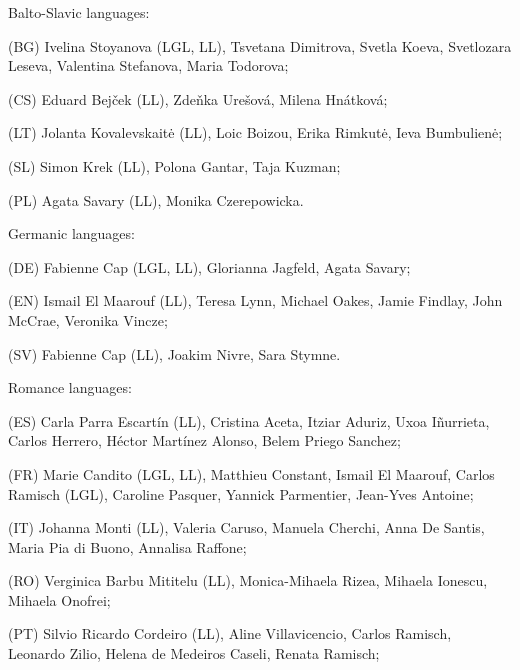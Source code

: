 \documentclass[output=paper,
modfonts,
]{langscibook}
\begin{document}
\noindent Balto-Slavic languages:
 \begin{sitem}
 \item (BG) Ivelina Stoyanova (LGL, LL), Tsvetana Dimitrova, Svetla Koeva, Svetlozara Leseva, Valentina Stefanova, Maria Todorova;
 \item (CS) Eduard Bejček (LL), Zdeňka Urešová, Milena Hnátková;
 \item (LT) Jolanta Kovalevskait\.e (LL), Loic Boizou, Erika Rimkut\.e, Ieva Bumbulien\.e;
 \item (SL) Simon Krek (LL), Polona Gantar, Taja Kuzman;
 \item (PL) Agata Savary (LL), Monika Czerepowicka.
 \end{sitem} 

\noindent Germanic languages:
 \begin{sitem}
 \item (DE) Fabienne Cap (LGL, LL), Glorianna Jagfeld, Agata Savary;
 \item (EN) Ismail El Maarouf (LL), Teresa Lynn, Michael Oakes, Jamie Findlay, John McCrae, Veronika Vincze;
 \item (SV) Fabienne Cap (LL), Joakim Nivre, Sara Stymne.
 \end{sitem} 

\noindent Romance languages:
 \begin{sitem}
 \item (ES) Carla Parra Escartín (LL), Cristina Aceta, Itziar Aduriz, Uxoa Iñurrieta, Carlos Herrero, Héctor Martínez Alonso, Belem Priego Sanchez;
 \item (FR) Marie Candito (LGL, LL), Matthieu Constant, Ismail El Maarouf, Carlos Ramisch (LGL), Caroline Pasquer, Yannick Parmentier, Jean-Yves Antoine;
 \item (IT) Johanna Monti (LL), Valeria Caruso, Manuela Cherchi, Anna De Santis, Maria Pia di Buono, Annalisa Raffone;
 \item (RO) Verginica Barbu Mititelu (LL), Monica-Mihaela Rizea, Mihaela Io\-nes\-cu, Mihaela Onofrei;
 \item (PT) Silvio Ricardo Cordeiro (LL), Aline Villavicencio, Carlos Ramisch, Le\-o\-nar\-do Zilio, Helena de Medeiros Caseli, Renata Ramisch;
 \end{sitem}
\end{document}
